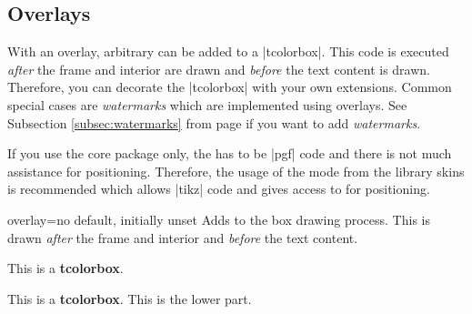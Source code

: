 \clearpage
\subsection{Overlays}\label{subsec:overlays}
With an overlay, arbitrary  can be added to a
|tcolorbox|. This code is executed \emph{after} the frame and interior are
drawn and \emph{before} the text content is drawn. Therefore, you can
decorate the |tcolorbox| with your own extensions.
Common special cases are \emph{watermarks} which are implemented using overlays.
See Subsection \ref{subsec:watermarks} from page \pageref{subsec:watermarks} if
you want to add \emph{watermarks}.
\begin{marker}
If you use the core package only, the  has to be |pgf| code
and there is not much assistance for positioning.
Therefore, the usage of the  mode from the library skins
is recommended which allows |tikz| code and gives access to
 for positioning.
\end{marker}

\begin{docTcbKey}{overlay}{=}{no default, initially unset}
  Adds  to the box drawing process. This 
  is drawn \emph{after} the frame and interior and \emph{before} the text content.

\begin{dispExample}

\begin{tcolorbox}[frogbox,title=My title]
This is a \textbf{tcolorbox}.
\end{tcolorbox}
\end{dispExample}

\enlargethispage*{5mm}
\begin{dispExample}

\begin{tcolorbox}[ribbonbox,title=My title]
This is a \textbf{tcolorbox}.
\tcblower
This is the lower part.
\end{tcolorbox}
\end{dispExample}
\end{docTcbKey}

